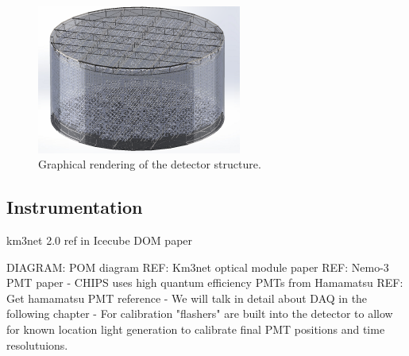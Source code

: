 \begin{figure} %
    \includegraphics[width=0.6\textwidth]{diagrams/4-chips/chips_render_2.png}
    \caption[Graphical rendering of the \chipsfive detector structure.]
    {Graphical rendering of the \chipsfive detector structure.}
    \label{fig:chips_render_2}
\end{figure}

\subsection{Instrumentation} %
\label{sec:chips_detector_instrumentation} %

km3net 2.0 ref in \cite{adrian2016}
Icecube DOM paper \cite{hanson2006}

DIAGRAM: POM diagram
REF: Km3net optical module paper
REF: Nemo-3 PMT paper
- CHIPS uses high quantum efficiency PMTs from Hamamatsu
REF: Get hamamatsu PMT reference
- We will talk in detail about DAQ in the following chapter
- For calibration "flashers" are built into the detector to allow for known location light
generation to calibrate final PMT positions and time resolutuions.

